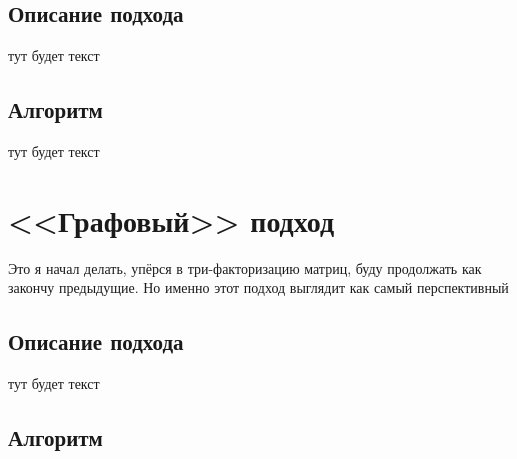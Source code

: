 \documentclass[14pt]{extreport}
\begin{document}
	\section{Описание подхода}
	тут будет текст
	\section{Алгоритм}
	тут будет текст

	\chapter{<<Графовый>> подход}
	Это я начал делать, упёрся в три-факторизацию матриц, буду продолжать как закончу предыдущие. Но именно этот подход выглядит как самый перспективный
	\section{Описание подхода}
	тут будет текст
	\section{Алгоритм}
	

	
	
\end{document}
